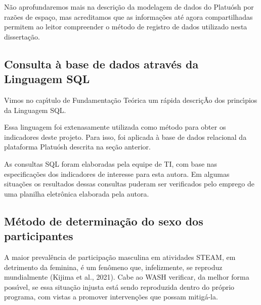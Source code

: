 \documentclass[
12pt,		%
openright,	%
twoside,  %
a4paper,			%
chapter=TITLE,		%
english,			%
french,				%
spanish,			%
brazil				%
]{USPSC-classe/USPSC}
\begin{document}
N\~ao aprofundaremos mais na descri\c{c}\~ao da modelagem de dados do Platu\'osh por raz\~oes de espa\c{c}o, mas acreditamos que as informa\c{c}\~oes at\'e agora compartilhadas permitem ao leitor compreender o m\'etodo de registro de dados utilizado nesta disserta\c{c}\~ao.








\subsection[Consulta \`a base de dados atrav\'es da Linguagem SQL]{Consulta \`a base de dados atrav\'es da Linguagem SQL}\label{Consulta \`a base de dados atrav\'es da Linguagem SQL}
Vimos no cap\'{\i}tulo de Fundamenta\c{c}\~ao Te\'orica um r\'apida descri\c{c}\~Ao dos princ\'{\i}pios da Linguagem SQL.








Essa linguagem foi extenasamente utilizada como m\'etodo para obter os indicadores deste projeto. Para isso, foi aplicada \`a base de dados relacional da plataforma Platu\'osh descrita na se\c{c}\~ao anterior.








As consultas SQL foram elaboradas pela equipe de TI, com base nas especifica\c{c}\~oes dos indicadores de interesse para esta autora. Em algumas situa\c{c}\~oes os resultados dessas consultas puderam ser verificados pelo emprego de uma planilha eletr\^onica elaborada pela autora.








\subsection[M\'etodo de determina\c{c}\~ao do sexo dos participantes]{M\'etodo de determina\c{c}\~ao do sexo dos participantes}\label{M\'etodo de determina\c{c}\~ao do sexo dos participantes}
A maior preval\^encia de participa\c{c}\~ao masculina em atividades STEAM, em detrimento da feminina, \'e um fen\^omeno que, infelizmente, se reproduz mundialmente (Kijima et al., 2021). Cabe ao WASH verificar, da melhor forma poss\'{\i}vel, se essa situa\c{c}\~ao injusta est\'a sendo reproduzida dentro do pr\'oprio programa, com vistas a promover interven\c{c}\~oes que possam mitig\'a-la.
\end{document}
